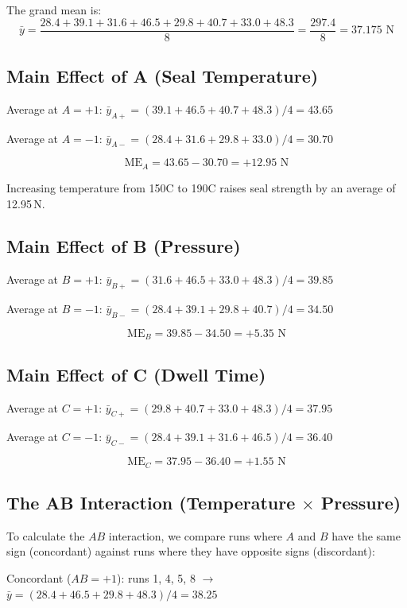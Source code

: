 \documentclass[11pt]{book}
\begin{document}
The grand mean is:
\[
\bar{y} = \frac{28.4 + 39.1 + 31.6 + 46.5 + 29.8 + 40.7 + 33.0 + 48.3}{8}
= \frac{297.4}{8} = 37.175 \text{ N}
\]

\subsection{Main Effect of A (Seal Temperature)}

Average at $A = +1$: $\bar{y}_{A+} = (39.1 + 46.5 + 40.7 + 48.3)/4 = 43.65$

Average at $A = -1$: $\bar{y}_{A-} = (28.4 + 31.6 + 29.8 + 33.0)/4 = 30.70$

\[
\text{ME}_A = 43.65 - 30.70 = +12.95 \text{ N}
\]

Increasing temperature from 150\textdegree C to 190\textdegree C raises seal
strength by an average of 12.95\,N.

\subsection{Main Effect of B (Pressure)}

Average at $B = +1$: $\bar{y}_{B+} = (31.6 + 46.5 + 33.0 + 48.3)/4 = 39.85$

Average at $B = -1$: $\bar{y}_{B-} = (28.4 + 39.1 + 29.8 + 40.7)/4 = 34.50$

\[
\text{ME}_B = 39.85 - 34.50 = +5.35 \text{ N}
\]

\subsection{Main Effect of C (Dwell Time)}

Average at $C = +1$: $\bar{y}_{C+} = (29.8 + 40.7 + 33.0 + 48.3)/4 = 37.95$

Average at $C = -1$: $\bar{y}_{C-} = (28.4 + 39.1 + 31.6 + 46.5)/4 = 36.40$

\[
\text{ME}_C = 37.95 - 36.40 = +1.55 \text{ N}
\]

\subsection{The AB Interaction (Temperature $\times$ Pressure)}

To calculate the $AB$ interaction, we compare runs where $A$ and $B$ have the
same sign (concordant) against runs where they have opposite signs (discordant):

Concordant ($AB = +1$): runs 1, 4, 5, 8 $\to$ $\bar{y} = (28.4 + 46.5 + 29.8 + 48.3)/4 = 38.25$
\end{document}
